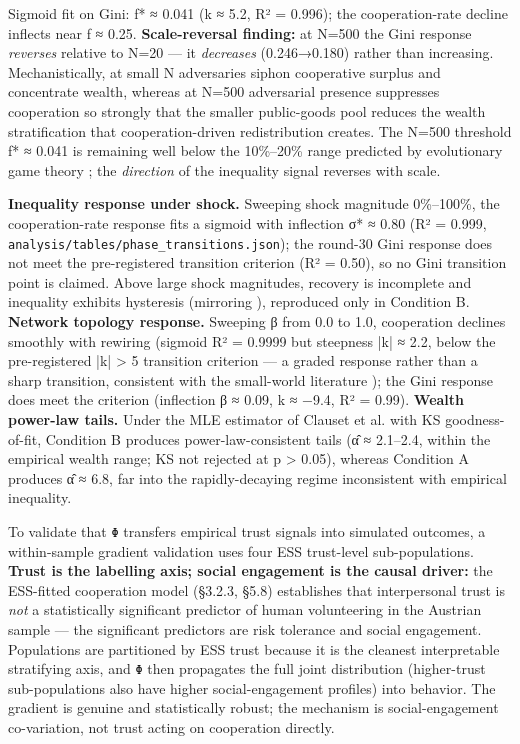 Sigmoid fit on Gini: f* ≈ 0.041 (k ≈ 5.2, R² = 0.996); the cooperation-rate decline inflects near f ≈ 0.25. \textbf{Scale-reversal finding:} at N=500 the Gini response \textit{reverses} relative to N=20 — it \textit{decreases} (0.246→0.180) rather than increasing. Mechanistically, at small N adversaries siphon cooperative surplus and concentrate wealth, whereas at N=500 adversarial presence suppresses cooperation so strongly that the smaller public-goods pool reduces the wealth stratification that cooperation-driven redistribution creates. The N=500 threshold f* ≈ 0.041 is remaining well below the 10\%–20\% range predicted by evolutionary game theory \cite{Nowak1992}; the \textit{direction} of the inequality signal reverses with scale.

\textbf{Inequality response under shock.} Sweeping shock magnitude 0\%–100\%, the cooperation-rate response fits a sigmoid with inflection σ* ≈ 0.80 (R² = 0.999, \texttt{analysis/tables/phase\_transitions.json}); the round-30 Gini response does not meet the pre-registered transition criterion (R² = 0.50), so no Gini transition point is claimed. Above large shock magnitudes, recovery is incomplete and inequality exhibits hysteresis (mirroring \cite{Piketty2014}), reproduced only in Condition B. \textbf{Network topology response.} Sweeping β from 0.0 to 1.0, cooperation declines smoothly with rewiring (sigmoid R² = 0.9999 but steepness |k| ≈ 2.2, below the pre-registered |k| > 5 transition criterion — a graded response rather than a sharp transition, consistent with the small-world literature \cite{Watts1998}); the Gini response does meet the criterion (inflection β ≈ 0.09, k ≈ −9.4, R² = 0.99). \textbf{Wealth power-law tails.} Under the MLE estimator of Clauset et al. \cite{Clauset2009} with KS goodness-of-fit, Condition B produces power-law-consistent tails (α̂ ≈ 2.1–2.4, within the empirical wealth range; KS not rejected at p > 0.05), whereas Condition A produces α̂ ≈ 6.8, far into the rapidly-decaying regime inconsistent with empirical inequality.


To validate that \texttt{Φ} transfers empirical trust signals into simulated outcomes, a within-sample gradient validation uses four ESS trust-level sub-populations. \textbf{Trust is the labelling axis; social engagement is the causal driver:} the ESS-fitted cooperation model (§3.2.3, §5.8) establishes that interpersonal trust is \textit{not} a statistically significant predictor of human volunteering in the Austrian sample — the significant predictors are risk tolerance and social engagement. Populations are partitioned by ESS trust because it is the cleanest interpretable stratifying axis, and \texttt{Φ} then propagates the full joint distribution (higher-trust sub-populations also have higher social-engagement profiles) into behavior. The gradient is genuine and statistically robust; the mechanism is social-engagement co-variation, not trust acting on cooperation directly.

